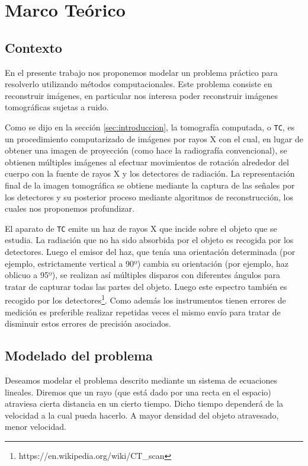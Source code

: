 \section{Marco Teórico}
\label{sec:Marco Teorico}

\subsection{Contexto}
En el presente trabajo nos proponemos modelar un problema práctico para resolverlo utilizando métodos computacionales.
Este problema consiste en reconstruir imágenes, en particular nos interesa
poder reconstruir imágenes tomográficas sujetas a ruido.

Como se dijo en la sección \ref{sec:introduccion}, la tomografía computada, o \verb|TC|, es un procedimiento
computarizado de imágenes por rayos X con el cual, en lugar de obtener una imagen de proyección
(como hace la radiografía convencional),
se obtienen múltiples imágenes al efectuar movimientos de rotación alrededor del cuerpo
con la fuente de rayos X y los detectores de radiación.
La representación final de la imagen tomográfica se obtiene mediante
la captura de las señales por los detectores y su posterior proceso mediante algoritmos de reconstrucción,
los cuales nos proponemos profundizar.

El aparato de \verb|TC| emite un haz de rayos X que incide sobre el objeto que se estudia.
La radiación que no ha sido absorbida por el objeto es recogida por los detectores.
Luego el emisor del haz, que tenía una orientación determinada (por ejemplo, estrictamente vertical a 90º)
cambia su orientación (por ejemplo, haz oblicuo a 95º),
se realizan así múltiples disparos con diferentes ángulos para tratar de capturar todas las partes del objeto.
Luego este espectro también es recogido por los detectores\footnote{https://en.wikipedia.org/wiki/CT\_scan}.
Como además los instrumentos tienen errores de medición es preferible realizar
repetidas veces el mismo envío para tratar de disminuir estos errores de precisión asociados. 

\subsection{Modelado del problema}
Deseamos modelar el problema descrito mediante un sistema de ecuaciones lineales.
Diremos que un rayo (que está dado por una recta en el espacio)
atraviesa cierta distancia en un cierto tiempo.
Dicho tiempo dependerá de la velocidad a la cual pueda hacerlo.
A mayor densidad del objeto atravesado, menor velocidad.

